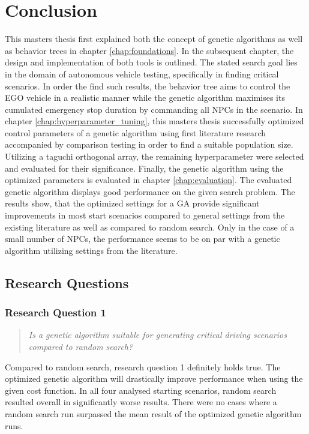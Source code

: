 \chapter{Conclusion}
This masters thesis first explained both the concept of genetic algorithms as well as behavior trees in chapter \ref{chap:foundations}. In the subsequent chapter, the design and implementation of both tools is outlined. The stated search goal lies in the domain of autonomous vehicle testing, specifically in finding critical scenarios. In order the find such results, the behavior tree aims to control the EGO vehicle in a realistic manner while the genetic algorithm maximises its cumulated emergency stop duration by commanding all NPCs in the scenario. In chapter \ref{chap:hyperparameter_tuning}, this masters thesis successfully optimized control parameters of a genetic algorithm using first literature research accompanied by comparison testing in order to find a suitable population size. Utilizing a taguchi orthogonal array, the remaining hyperparameter were selected and evaluated for their significance. Finally, the genetic algorithm using the optimized parameters is evaluated in chapter \ref{chap:evaluation}. The evaluated genetic algorithm displays good performance on the given search problem. The results show, that the optimized settings for a GA provide significant improvements in most start scenarios compared to general settings from the existing literature as well as compared to random search. Only in the case of a small number of NPCs, the performance seems to be on par with a genetic algorithm utilizing settings from the literature.

\section{Research Questions}
\subsection{Research Question 1}
\begin{quote}
	\begin{em}
		\textit{Is a genetic algorithm suitable for generating critical driving scenarios compared to random search?}
	\end{em}
\end{quote}

Compared to random search, research question 1 definitely holds true. The optimized genetic algorithm will drastically improve performance when using the given cost function. In all four analysed starting scenarios, random search resulted overall in significantly worse results. There were no cases where a random search run surpassed the mean result of the optimized genetic algorithm runs.

